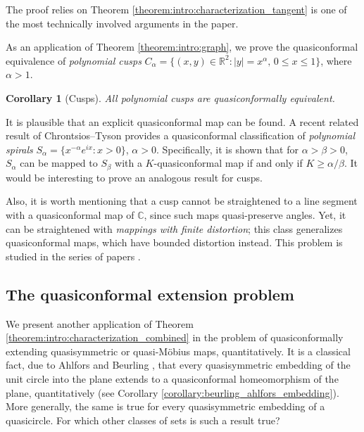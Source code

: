 \documentclass[letterpaper]{amsart}
\theoremstyle{plain}
\newtheorem{corollary}[theorem]{Corollary}
\theoremstyle{definition}
\theoremstyle{remark}
\numberwithin{equation}{section}
\numberwithin{theorem}{section}
\newcommand{\R}{\mathbb R}
\newcommand{\C}{\mathbb C}
\begin{document}
The proof relies on Theorem \ref{theorem:intro:characterization_tangent} is one of the most technically involved arguments in the paper.

As an application of Theorem \ref{theorem:intro:graph}, we prove the quasiconformal equivalence of \textit{polynomial cusps}  $C_\alpha=\{(x,y)\in \R^2: |y|=x^\alpha, \, 0\leq x\leq 1\}$, where $\alpha>1$.

\begin{corollary}[Cusps]\label{corollary:intro:cusps}
All polynomial cusps are quasiconformally equivalent.
\end{corollary}

It is plausible that an explicit quasiconformal map can be found. A recent related result of Chrontsios--Tyson \cite{ChrontsiosTyson:assouad} provides a quasiconformal classification of \textit{polynomial spirals} $S_\alpha=\{x^{-\alpha} e^{ix}: x>0\}$, $\alpha>0$. Specifically, it is shown that for $\alpha>\beta>0$, $S_\alpha$ can be mapped to $S_\beta$ with a $K$-quasiconformal map if and only if $K\geq \alpha/\beta$. It would be interesting to prove an analogous result for cusps. 

Also, it is worth mentioning that a cusp cannot be straightened to a line segment with a quasiconformal map of $\C$, since such maps quasi-preserve angles. Yet, it can be straightened with \textit{mappings with finite distortion}; this class generalizes quasiconformal maps, which have bounded distortion instead. This problem is studied in the series of papers \cites{KoskelaTakkinen:cusp1, KoskelaTakkinen:cusp2, KoskelaTakkinen:cusp3, KoskelaTakkinen:cusp2note, GuoKoskelaTakkinen:quasidisks, IwaniecOnninenZhu:quasidisks}.

\subsection{The quasiconformal extension problem}

We present another application of Theorem \ref{theorem:intro:characterization_combined} in the problem of quasiconformally extending quasisymmetric or quasi-M\"obius maps, quantitatively. It is a classical fact, due to Ahlfors and Beurling \cites{BeurlingAhlfors:extension, Ahlfors:reflections}, that every quasisymmetric embedding of the unit circle into the plane extends to a quasiconformal homeomorphism of the plane, quantitatively (see Corollary \ref{corollary:beurling_ahlfors_embedding}). More generally, the same is true for every quasisymmetric embedding of a quasicircle. For which other classes of sets is such a result true? 
\end{document}
